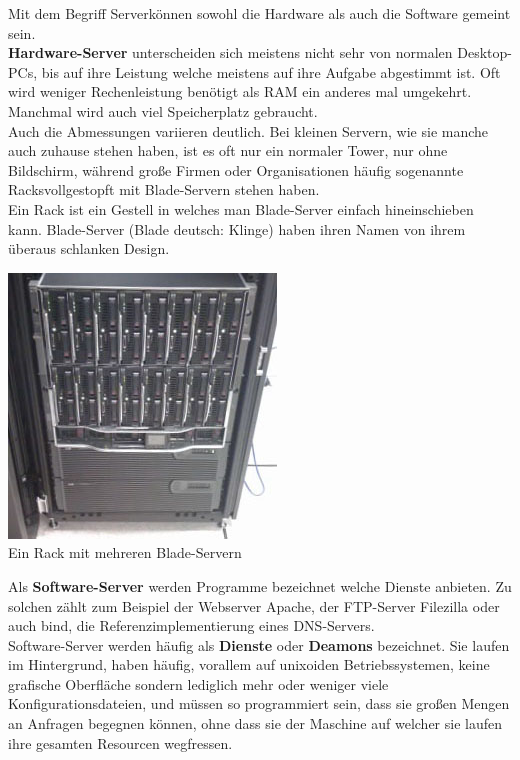 \documentclass[12pt,a4paper]{report}
\begin{document}
Mit dem Begriff \glqq Server\grqq können sowohl die Hardware als auch die Software gemeint sein.\\
\textbf{Hardware-Server} unterscheiden sich meistens nicht sehr von normalen Desktop-PCs, bis auf ihre Leistung welche meistens auf ihre Aufgabe abgestimmt ist. Oft wird weniger Rechenleistung benötigt als RAM ein anderes mal umgekehrt. Manchmal wird auch viel Speicherplatz gebraucht.\\
Auch die Abmessungen variieren deutlich. Bei kleinen Servern, wie sie manche auch zuhause stehen haben, ist es oft nur ein normaler Tower, nur ohne Bildschirm, während große Firmen oder Organisationen häufig sogenannte \glqq Racks\grqq vollgestopft mit Blade-Servern stehen haben.\\
Ein Rack ist ein Gestell in welches man Blade-Server einfach hineinschieben kann. Blade-Server (Blade deutsch: Klinge) haben ihren Namen von ihrem überaus schlanken Design.\\

\begin{center}
\includegraphics[scale=0.8]{../docs/tarkes/pics/ServerRack.jpg}\\
Ein Rack mit mehreren Blade-Servern 
\end{center}

Als \textbf{Software-Server} werden Programme bezeichnet welche Dienste anbieten. Zu solchen zählt zum Beispiel der Webserver Apache, der FTP-Server Filezilla oder auch bind, die Referenzimplementierung eines DNS-Servers.\\
Software-Server werden häufig als \textbf{Dienste} oder \textbf{Deamons} bezeichnet. Sie laufen im Hintergrund, haben häufig, vorallem auf unixoiden Betriebssystemen, keine grafische Oberfläche sondern lediglich mehr oder weniger viele Konfigurationsdateien, und müssen so programmiert sein, dass sie großen Mengen an Anfragen begegnen können, ohne dass sie der Maschine auf welcher sie laufen ihre gesamten Resourcen wegfressen.\\
\end{document}
